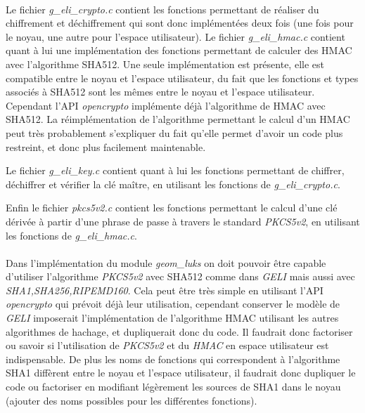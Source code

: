\paragraph{}
Le fichier {\em g\_eli\_crypto.c} contient les fonctions permettant de réaliser
du chiffrement et déchiffrement qui sont donc implémentées deux fois (une fois
pour le noyau, une autre pour l'espace utilisateur). Le fichier
{\em g\_eli\_hmac.c} contient quant à lui une implémentation des fonctions
permettant de calculer des HMAC avec l'algorithme SHA512. Une seule implémentation
est présente, elle est compatible entre le noyau et l'espace utilisateur, du fait
que les fonctions et types associés à SHA512 sont les mêmes entre le noyau et
l'espace utilisateur.
Cependant l'API {\em opencrypto} implémente déjà l'algorithme de HMAC avec SHA512.
La réimplémentation de l'algorithme permettant le calcul d'un HMAC peut très
probablement s'expliquer du fait qu'elle permet d'avoir un code plus restreint,
et donc plus facilement maintenable.

Le fichier {\em g\_eli\_key.c} contient quant à lui les fonctions permettant de
chiffrer, déchiffrer et vérifier la clé maître, en utilisant les fonctions de
{\em g\_eli\_crypto.c}.

Enfin le fichier {\em pkcs5v2.c} contient les fonctions permettant le calcul
d'une clé dérivée à partir d'une phrase de passe à travers le standard
{\em PKCS5v2}, en utilisant les fonctions de {\em g\_eli\_hmac.c}.

\paragraph{}
Dans l'implémentation du module {\em geom\_luks} on doit pouvoir être capable
d'utiliser l'algorithme {\em PKCS5v2} avec SHA512 comme dans {\em GELI} mais
aussi avec {\em SHA1,SHA256,RIPEMD160}. Cela peut être très simple en utilisant
l'API {\em opencrypto} qui prévoit déjà leur utilisation, cependant conserver
le modèle de {\em GELI} imposerait l'implémentation de l'algorithme HMAC utilisant
les autres algorithmes de hachage, et dupliquerait donc du code. Il faudrait
donc factoriser ou savoir si l'utilisation de {\em PKCS5v2} et du {\em HMAC}
en espace utilisateur est indispensable. De plus les noms de fonctions qui
correspondent à l'algorithme SHA1 diffèrent entre le noyau et l'espace
utilisateur, il faudrait donc dupliquer le code ou factoriser en modifiant
légèrement les sources de SHA1 dans le noyau (ajouter des noms possibles pour
les différentes fonctions).

